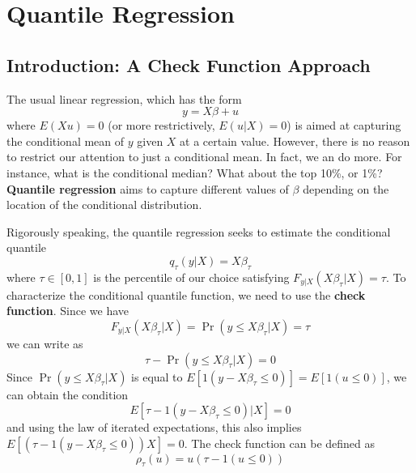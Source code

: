

\chapter{Quantile Regression}
\section{Introduction: A Check Function Approach}
The usual linear regression, which has the form
\[
y= X\beta+u
\]
where $E(Xu)=0$ (or more restrictively, $E(u|X)=0$) is aimed at capturing the conditional mean of $y$ given $X$ at a certain value. However, there is no reason to restrict our attention to just a conditional mean. In fact, we an do more. For instance, what is the conditional median? What about the top 10\%, or 1\%? \textbf{Quantile regression} aims to capture different values of $\beta$ depending on the location of the conditional distribution. \par 
Rigorously speaking, the quantile regression seeks to estimate the conditional quantile
\[
q_\tau(y | X)=X\beta_\tau
\]
where $\tau\in[0,1]$ is the percentile of our choice satisfying $F_{y|X}(X\beta_\tau|X)=\tau$. To characterize the conditional quantile function, we need to use the \textbf{check function}. Since we have
\[
F_{y|X}(X\beta_\tau|X)=\Pr(y\leq X\beta_\tau|X)=\tau
\]
we can write as
\[
\tau-\Pr(y\leq X\beta_\tau|X)=0
\]
Since $\Pr(y\leq X\beta_\tau|X)$ is equal to $E[1(y- X\beta_\tau\leq 0)]=E[1(u\leq0)]$, we can obtain the condition
\[
E[\tau-1(y- X\beta_\tau\leq 0)|X]=0
\]
and using the law of iterated expectations, this also implies $E[(\tau-1(y- X\beta_\tau\leq 0))X]=0$. The check function can be defined as
\[
\rho_\tau(u)=u(\tau-1(u\leq0))
\]
